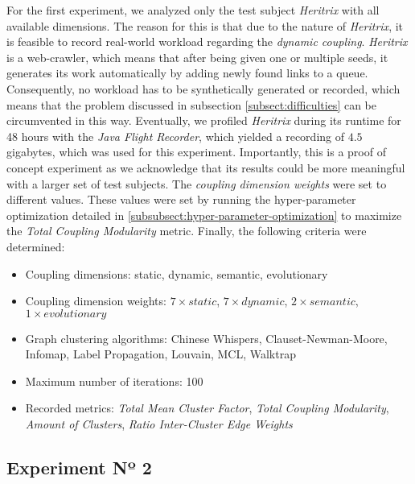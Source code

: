 \documentclass[12pt,a4paper]{report}
\begin{document}
For the first experiment, we analyzed only the
test subject \textit{Heritrix} with all available dimensions. The reason for
this is that due to the nature of \textit{Heritrix}, it is feasible to record
real\hyp world workload regarding the \textit{dynamic coupling}. \textit{Heritrix}
is a web\hyp crawler, which means that after being given one or
multiple seeds, it generates its work automatically by adding newly found links
to a queue. Consequently, no workload has to be synthetically generated or
recorded, which means that the problem discussed in subsection
\ref{subsect:difficulties} can be circumvented in this way.
Eventually, we profiled \textit{Heritrix} during its runtime
for 48 hours with the \textit{Java Flight Recorder},
which yielded a recording of $4.5$ gigabytes, which was used for
this experiment. Importantly, this is a proof of concept experiment as we
acknowledge that its results could be more meaningful with a larger set of test
subjects. The \textit{coupling dimension weights} were set to
different values. These values were set by running the hyper\hyp parameter
optimization detailed in \ref{subsubsect:hyper-parameter-optimization} to
maximize the \textit{Total Coupling Modularity} metric. Finally, the following
criteria were determined:
\begin{itemize}[noitemsep]
    \item Coupling dimensions: static, dynamic, semantic, evolutionary
    \item Coupling dimension weights: $7 \times static$, $7 \times dynamic$, $2 \times semantic$, $1 \times evolutionary$
    \item Graph clustering algorithms: Chinese Whispers, Clauset-Newman-Moore, Infomap, Label Propagation, Louvain, MCL, Walktrap
    \item Maximum number of iterations: 100
    \item Recorded metrics:
    \textit{Total Mean Cluster Factor},
    \textit{Total Coupling Modularity},
    \textit{Amount of Clusters},
    \textit{Ratio Inter-Cluster Edge Weights}
\end{itemize}


\subsection{Experiment Nº 2}
\end{document}
